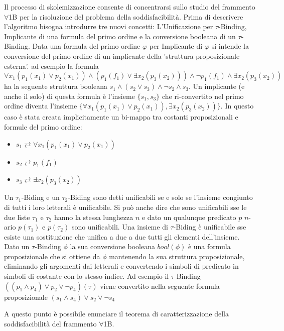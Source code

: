 \documentclass[./main.tex]{subfiles}
\begin{document}
Il processo di skolemizzazione consente di concentrarsi sullo studio del frammento $\forall$1B
per la risoluzione del problema della soddisfacibilità. 
Prima di descrivere l'algoritmo bisogna introdurre tre nuovi concetti:
L'Unificazione per $\tau$-Binding, Implicante di una formula del primo ordine e la conversione booleana di un $\tau$-Binding.
Data una formula del primo ordine $\varphi$ per Implicante di $\varphi$ si intende la conversione del primo ordine di
un implicante della 'struttura proposizionale esterna'.
ad esempio la formula
$\forall x_1 (p_1(x_1) \lor p_2(x_1)) \land (p_1(f_1) \lor \exists x_2 (p_3(x_2))) \land \lnot p_1(f_1) \land \exists x_2 (p_3(x_2))$
ha la seguente struttura booleana  $s_1 \land (s_2 \lor s_3) \land \lnot s_2 \land s_3$.
Un implicante (e anche il solo) di questa formula è l'insieme $\{s_1, s_3\}$ che ri-convertito nel primo ordine diventa
l'insieme $\{\forall x_1 (p_1(x_1) \lor p_2(x_1)), \exists x_2 (p_3(x_2))\}$.
In questo caso è stata creata implicitamente un bi-mappa tra costanti proposizionali e formule del primo ordine:
\begin{itemize}
    \item $s_1 \rightleftarrows \forall x_1 (p_1(x_1) \lor p_2(x_1))$
    \item $s_2 \rightleftarrows p_1(f_1)$
    \item $s_3 \rightleftarrows \exists x_2 (p_3(x_2))$
\end{itemize}
Un $\tau_1$-Biding e un $\tau_2$-Biding sono detti unificabili se e solo se l'insieme congiunto di tutti i loro letterali è unificabile.
Si può anche dire che sono unificabili sse 
le due liste $\tau_1$ e $\tau_2$ hanno la stessa lunghezza $n$ e dato un qualunque predicato $p$ $n$-ario
$p(\tau_1)$ e $p(\tau_2)$ sono unificabili. 
Una insieme di $\tau$-Biding è unificabile sse esiste una sostituzione che unifica a due a due tutti gli elementi dell'insieme.
Dato un $\tau$-Binding $\phi$ la sua conversione booleana $bool(\phi)$ è una formula proposizionale che si ottiene 
da $\phi$ mantenendo la sua struttura proposizionale, eliminando gli argomenti dai letterali e convertendo
i simboli di predicato in simboli di costante con lo stesso indice. Ad esempio il $\tau$-Binding
$((p_1 \land p_4) \lor p_2 \lor \lnot p_4)(\tau)$ viene convertito nella seguente formula proposizionale $(s_1 \land s_4) \lor s_2 \lor \lnot s_4$

A questo punto è possibile enunciare il teorema di caratterizzazione della soddisfacibilità del frammento $\forall$1B.
\end{document}
